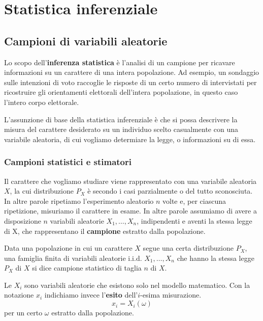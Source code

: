 \part{Statistica inferenziale}

\chapter{Campioni di variabili aleatorie}
Lo scopo dell’\textbf{inferenza statistica} è l'analisi di un campione per ricavare informazioni
su un carattere di una intera popolazione. Ad esempio, un sondaggio sulle intenzioni di voto
raccoglie le risposte di un certo numero di intervistati per ricostruire gli orientamenti
elettorali dell’intera popolazione, in questo caso l’intero corpo elettorale.

L’assunzione di base della statistica inferenziale è che si possa descrivere la misura del carattere
desiderato su un individuo scelto casualmente con una variabile aleatoria, di cui vogliamo
determiare la legge, o informazioni su di essa.

\section{Campioni statistici e stimatori}
Il carattere che vogliamo studiare viene rappresentato con una variabile aleatoria
$X$, la cui distribuzione $P_X$ è secondo i casi parzialmente o del tutto sconosciuta. In altre
parole ripetiamo l'esperimento aleatorio $n$ volte e, per ciascuna ripetizione, misuriamo il
carattere in esame. In altre parole assumiamo di avere a disposizione $n$ variabili aleatorie
$X_1, \dots, X_n$, indipendenti e aventi la stessa legge di X, che rappresentano il
\textbf{campione} estratto dalla popolazione.

\begin{definition}\label{def: campione statistico}
	Data una popolazione in cui un carattere $X$ segue una certa distribuzione $P_X$, una famiglia
	finita di variabili aleatorie i.i.d. $X_1, \dots, X_n$ che hanno la stessa legge $P_X$ di $X$
	si dice campione statistico di taglia $n$ di $X$.
\end{definition}

\begin{observation}
	Le $X_i$ sono variabili aleatorie che esistono solo nel modello matematico. Con la notazione
	$x_i$ indichiamo invece l'\textbf{esito} dell'$i$-esima misurazione.
	\[ x_i = X_i(\omega) \]
	per un certo $\omega$ estratto dalla popolazione.
\end{observation}

